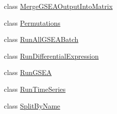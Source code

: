 \begin{DoxyCompactItemize}
class \hyperlink{classbroad_1_1pda_1_1differential_expression_1_1_merge_g_s_e_a_output_into_matrix}{Merge\+G\+S\+E\+A\+Output\+Into\+Matrix}
\item 
class \hyperlink{classbroad_1_1pda_1_1differential_expression_1_1_permutations}{Permutations}
\item 
class \hyperlink{classbroad_1_1pda_1_1differential_expression_1_1_run_all_g_s_e_a_batch}{Run\+All\+G\+S\+E\+A\+Batch}
\item 
class \hyperlink{classbroad_1_1pda_1_1differential_expression_1_1_run_differential_expression}{Run\+Differential\+Expression}
\item 
class \hyperlink{classbroad_1_1pda_1_1differential_expression_1_1_run_g_s_e_a}{Run\+G\+S\+E\+A}
\item 
class \hyperlink{classbroad_1_1pda_1_1differential_expression_1_1_run_time_series}{Run\+Time\+Series}
\item 
class \hyperlink{classbroad_1_1pda_1_1differential_expression_1_1_split_by_name}{Split\+By\+Name}
\end{DoxyCompactItemize}
